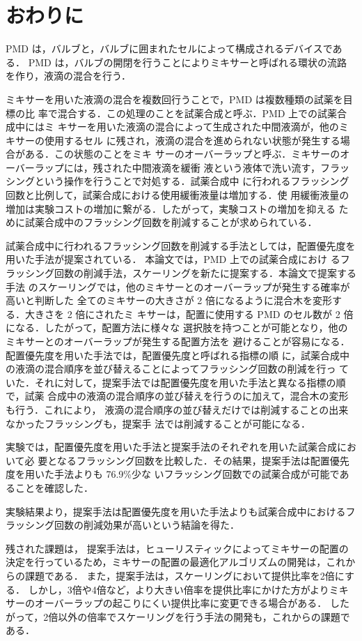 \chapter{おわりに}
PMD は，バルブと，バルブに囲まれたセルによって構成されるデバイスである．
PMD は，バルブの開閉を行うことによりミキサーと呼ばれる環状の流路を作り，液滴の混合を行う．

ミキサーを用いた液滴の混合を複数回行うことで，PMD は複数種類の試薬を目標の比
率で混合する．この処理のことを試薬合成と呼ぶ．PMD 上での試薬合成中にはミ
キサーを用いた液滴の混合によって生成された中間液滴が，他のミキサーの使用するセル
に残され，液滴の混合を進められない状態が発生する場合がある．この状態のことをミキ
サーのオーバーラップと呼ぶ．ミキサーのオーバーラップには，残された中間液滴を緩衝
液という液体で洗い流す，フラッシングという操作を行うことで対処する．試薬合成中
に行われるフラッシング回数と比例して，試薬合成における使用緩衝液量は増加する．使
用緩衝液量の増加は実験コストの増加に繋がる．したがって，実験コストの増加を抑える
ために試薬合成中のフラッシング回数を削減することが求められている．

試薬合成中に行われるフラッシング回数を削減する手法としては，配置優先度を用いた手法が提案されている．
本論文では，PMD 上での試薬合成におけ
るフラッシング回数の削減手法，スケーリングを新たに提案する．本論文で提案する手法
のスケーリングでは，他のミキサーとのオーバーラップが発生する確率が高いと判断した
全てのミキサーの大きさが 2 倍になるように混合木を変形する．大きさを 2 倍にされたミ
キサーは，配置に使用する PMD のセル数が 2 倍になる．したがって，配置方法に様々な
選択肢を持つことが可能となり，他のミキサーとのオーバーラップが発生する配置方法を
避けることが容易になる．配置優先度を用いた手法では，配置優先度と呼ばれる指標の順
に，試薬合成中の液滴の混合順序を並び替えることによってフラッシング回数の削減を行っ
ていた．それに対して，提案手法では配置優先度を用いた手法と異なる指標の順で，試薬
合成中の液滴の混合順序の並び替えを行うのに加えて，混合木の変形も行う．これにより，
液滴の混合順序の並び替えだけでは削減することの出来なかったフラッシングも，提案手
法では削減することが可能になる．

実験では，配置優先度を用いた手法と提案手法のそれぞれを用いた試薬合成において必
要となるフラッシング回数を比較した．その結果，提案手法は配置優先度を用いた手法よりも 76.9\%少な
いフラッシング回数での試薬合成が可能であることを確認した．

実験結果より，提案手法は配置優先度を用いた手法よりも試薬合成中におけるフラッシング回数の削減効果が高いという結論を得た．

残された課題は，
提案手法は，ヒューリスティックによってミキサーの配置の決定を行っているため，ミキサーの配置の最適化アルゴリズムの開発は，これからの課題である．
また，提案手法は，スケーリングにおいて提供比率を2倍にする．
しかし，3倍や4倍など，より大きい倍率を提供比率にかけた方がよりミキサーのオーバーラップの起こりにくい提供比率に変更できる場合がある．
したがって，2倍以外の倍率でスケーリングを行う手法の開発も，これからの課題である．


